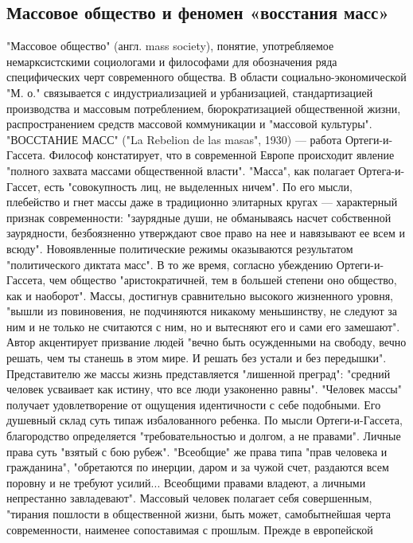 \documentclass[12pt]{article}
\begin{document}
\subsection{Массовое общество и феномен «восстания масс»}
"Массовое  общество"  (англ.  mass  society),  понятие,  употребляемое  немарксистскими  социологами  и
философами  для  обозначения  ряда  специфических  черт  современного  общества.  В  области  социально-экономической "М. о."  связывается с индустриализацией и урбанизацией,  стандартизацией  производства  и 
массовым  потреблением,  бюрократизацией  общественной  жизни,  распространением  средств  массовой
коммуникации и "массовой культуры".
"ВОССТАНИЕ МАСС" ("La Rebelion de las masas", 1930) — работа Ортеги-и-Гассета. Философ констатирует,
что в современной Европе происходит явление "полного захвата массами общественной власти". "Масса", как
полагает Ортега-и-Гассет, есть "совокупность лиц, не выделенных ничем". По его мысли, плебейство и гнет
массы даже в традиционно элитарных кругах — характерный признак современности: "заурядные души, не
обманываясь насчет собственной заурядности, безбоязненно утверждают свое право на нее и навязывают ее
всем и всюду". Новоявленные политические режимы оказываются результатом "политического диктата масс". В
то же время, согласно убеждению Ортеги-и-Гассета, чем общество "аристократичней, тем в большей степени
оно  общество, как и  наоборот".  Массы, достигнув  сравнительно высокого  жизненного уровня, "вышли  из
повиновения, не подчиняются никакому меньшинству, не следуют за ним и не только не считаются с ним, но и
вытесняют его и  сами его замешают". Автор  акцентирует  призвание  людей "вечно быть  осужденными на
свободу, вечно решать, чем ты станешь в этом мире. И решать без устали и без передышки". Представителю же
массы  жизнь  представляется  "лишенной  преград":  "средний  человек  усваивает  как  истину,  что  все  люди
узаконенно равны". "Человек массы" получает удовлетворение от ощущения идентичности с себе подобными.
Его  душевный  склад  суть  типаж  избалованного  ребенка.  По  мысли  Ортеги-и-Гассета,  благородство
определяется  "требовательностью  и  долгом,  а  не  правами".  Личные  права  суть  "взятый  с  бою  рубеж".
"Всеобщие" же права типа "прав человека и гражданина", "обретаются по инерции, даром и за чужой счет,
раздаются  всем  поровну  и  не  требуют  усилий...  Всеобщими  правами  владеют,  а  личными  непрестанно
завладевают". Массовый человек полагает себя совершенным, "тирания пошлости в общественной жизни, быть
может,  самобытнейшая  черта  современности,  наименее  сопоставимая  с  прошлым.  Прежде  в  европейской
\end{document}
